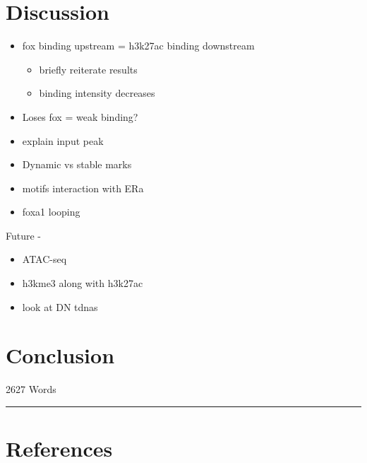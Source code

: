\documentclass[
  12pt,
]{article}
\begin{document}
\hypertarget{discussion}{%
\section{Discussion}\label{discussion}}

\begin{itemize}
\item
  fox binding upstream = h3k27ac binding downstream

  \begin{itemize}
  \item
    briefly reiterate results
  \item
    binding intensity decreases
  \end{itemize}
\item
  Loses fox = weak binding?
\item
  explain input peak
\item
  Dynamic vs stable marks
\item
  motifs interaction with ERa
\item
  foxa1 looping
\end{itemize}

Future -

\begin{itemize}
\item
  ATAC-seq
\item
  h3kme3 along with h3k27ac
\item
  look at DN tdnas
\end{itemize}

\hypertarget{conclusion}{%
\section{Conclusion}\label{conclusion}}

\begin{flushright}
2627 Words
\end{flushright}
\footnotesize

\begin{center}\rule{0.5\linewidth}{0.5pt}\end{center}

\hypertarget{references}{%
\section*{References}\label{references}}
\end{document}
